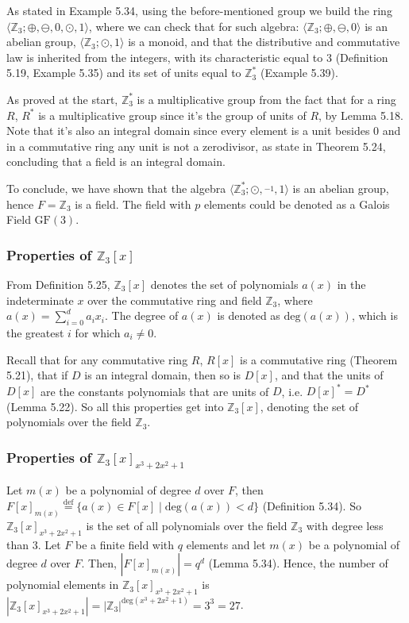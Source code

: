\documentclass[unicode,11pt,a4paper,oneside,numbers=endperiod,openany]{scrartcl}
\def\Z{\mathbb{Z}}
\def\GF{\textrm{GF}}
\def\deg{\textrm{deg}}
\newcommand{\Zgmult}[1]{\mathbb{Z}_{#1}^{\ast}}
\begin{document}
As stated in Example 5.34, using the before-mentioned group we build the ring 
\( \langle \Z_3; \oplus, \ominus, 0, \odot, 1 \rangle \), where we can check that for such algebra:
\( \langle \Z_3; \oplus, \ominus, 0 \rangle \) is an abelian group,
\( \langle \Z_3; \odot, 1 \rangle \) is a monoid,
and that the distributive and commutative law is inherited from the integers,
with its characteristic equal to \( 3 \) (Definition 5.19, Example 5.35) 
and its set of units equal to \( \Zgmult{3} \) (Example 5.39).

As proved at the start, \( \Zgmult{3} \) is a multiplicative group
from the fact that for a ring \( R \), \( R^* \) is a multiplicative group 
since it's the group of units of \( R \), by Lemma 5.18.
Note that it's also an integral domain since every element is a unit besides \( 0 \)
and in a commutative ring any unit is not a zerodivisor, as state in Theorem 5.24,
concluding that a field is an integral domain.

To conclude, we have shown that the algebra 
\( \langle \Zgmult{3}; \odot, \overset{-1}{\ }, 1 \rangle \)
is an abelian group, hence \( F = \Z_3 \) is a field.
The field with \( p \) elements could be denoted as a Galois Field \( \GF(3) \).

\subsubsection*{Properties of \( \Z_3[x] \) }

From Definition 5.25, \( \Z_3[x] \) denotes the set of polynomials \( a(x) \) 
in the indeterminate \( x \)
over the commutative ring and field \( \Z_3 \),
where \( a(x) = \sum_{i=0}^{d} a_i x_i \).
The degree of \( a(x) \) is denoted as \( \deg(a(x)) \), 
which is the greatest \( i \) for which \( a_i \neq 0 \).

Recall that for any commutative ring \( R \),
\( R[x] \) is a commutative ring (Theorem 5.21),
that if \( D \) is an integral domain, then so is \( D[x] \),
and that the units of \( D[x] \) are the constants polynomials that are units of \( D \),
i.e. \( D[x]^* = D^* \) (Lemma 5.22).
So all this properties get into \( \Z_3[x] \), 
denoting the set of polynomials over the field \( \Z_3 \).

\subsubsection*{Properties of \( \Z_3[x]_{x^3 + 2x^2 + 1} \)} 

Let \( m(x) \) be a polynomial of degree \( d \) over \( F \), then
\( F[x]_{m(x)} \overset{\text{def}}{=} \{ a(x) \in F[x] \mid \deg(a(x)) < d \} \)
(Definition 5.34). 
So 
\( \Z_3[x]_{x^3 + 2x^2 + 1} \)
is the set of all polynomials over the field \( \Z_3 \) with degree less than \( 3 \).
Let \( F \) be a finite field with \( q \) elements and let \( m(x) \) be a polynomial 
of degree \( d \) over \( F \). 
Then, \( | F[x]_{m(x)} | = q^d \)
(Lemma 5.34).
Hence, the number of polynomial elements in 
\( \Z_3[x]_{x^3 + 2x^2 + 1} \)
is 
\( | \Z_3[x]_{x^3 + 2x^2 + 1} |
=
| \Z_3 |^{\deg(x^3 + 2x^2 + 1)}
=
3^3 = 27 \).
\end{document}
